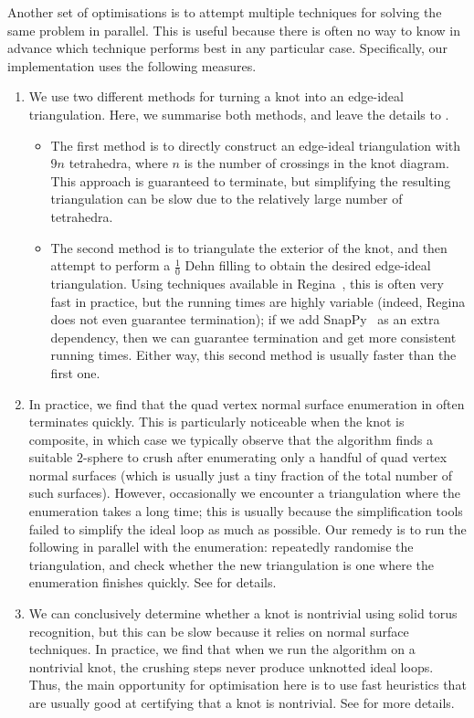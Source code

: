 \documentclass[10pt,a4paper]{amsart}
\begin{document}
Another set of optimisations is to attempt multiple techniques for solving the same problem in parallel. This is useful because there is often no way to know in advance which technique performs best in any particular case.
Specifically, our implementation uses the following measures.
\begin{enumerate}
\item\label{app:bottleneck:buildIdealEdge}
We use two different methods for turning a knot into an edge-ideal triangulation.
Here, we summarise both methods, and leave the details to .
	\begin{itemize}
	\item
	The first method is to directly construct an edge-ideal triangulation with $9n$ tetrahedra, where $n$ is the number of crossings in the knot diagram.
	This approach is guaranteed to terminate, but simplifying the resulting triangulation can be slow due to the relatively large number of tetrahedra.
	\item
	The second method is to triangulate the exterior of the knot, and then attempt to perform a $\frac{1}{0}$ Dehn filling to obtain the desired edge-ideal triangulation.
	Using techniques available in Regina~\cite{Regina}, this is often very fast in practice,
	but the running times are highly variable (indeed, Regina does not even guarantee termination);
	if we add SnapPy~\cite{SnapPy} as an extra dependency, then we can guarantee termination and get more consistent running times.
	Either way, this second method is usually faster than the first one.
	\end{itemize}
\item\label{app:bottleneck:enumerate}
In practice, we find that the quad vertex normal surface enumeration in  often terminates quickly.
This is particularly noticeable when the knot is composite, in which case we typically observe that the algorithm finds a suitable $2$-sphere to crush after enumerating only a handful of quad vertex normal surfaces
(which is usually just a tiny fraction of the total number of such surfaces).
However, occasionally we encounter a triangulation where the enumeration takes a long time;
this is usually because the simplification tools failed to simplify the ideal loop as much as possible.
Our remedy is to run the following in parallel with the enumeration: repeatedly randomise the triangulation, and check whether the new triangulation is one where the enumeration finishes quickly.
See  for details.
\item\label{app:bottleneck:nontriviality}
We can conclusively determine whether a knot is nontrivial using solid torus recognition, but this can be slow because it relies on normal surface techniques.
In practice, we find that when we run the algorithm on a nontrivial knot, the crushing steps never produce unknotted ideal loops.
Thus, the main opportunity for optimisation here is to use fast heuristics that are usually good at certifying that a knot is nontrivial.
See  for more details.
\end{enumerate}
\end{document}
